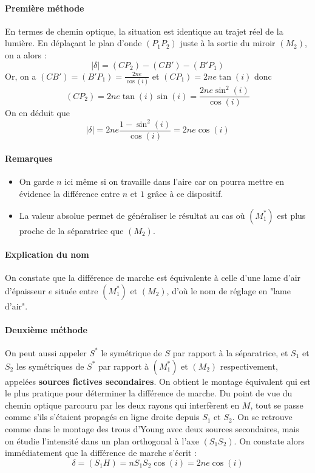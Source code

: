 \documentclass[french]{book}
\theoremstyle{plain}
\theoremstyle{definition}
\theoremstyle{remark}
\newcommand{\st}{^*}
\begin{document}
\paragraph{Première méthode}
En termes de chemin optique, la situation est identique au trajet réel de la lumière. En déplaçant le plan d'onde $(P_1P_2)$ juste à la sortie du miroir $(M_2)$, on a alors : $$\lvert\delta\rvert=(CP_2)-(CB')-(B'P_1)$$ Or, on a $(CB')=(B'P_1)=\displaystyle\frac{2ne}{\cos(i)}$ et $(CP_1)=\displaystyle 2ne\tan(i)$ donc $$(CP_2)=2ne\tan(i)\sin(i)=\frac{2ne\sin^2(i)}{\cos(i)}$$ On en déduit que $$\lvert\delta\rvert =2ne\frac{1-\sin^2(i)}{\cos(i)}=2ne\cos(i)$$
\paragraph{Remarques}
\begin{itemize}
	\item On garde $n$ ici même si on travaille dans l'aire car on pourra mettre en évidence la différence entre $n$ et $1$ grâce à ce dispositif.
	\item La valeur absolue permet de généraliser le résultat au cas où $(M_1\st)$ est plus proche de la séparatrice que $(M_2)$.	
\end{itemize}
\paragraph{Explication du nom} On constate que la différence de marche est équivalente à celle d'une lame d'air d'épaisseur $e$ située entre $(M_1\st)$ et $(M_2)$, d'où le nom de réglage en "lame d'air".
\paragraph{Deuxième méthode}
On peut aussi appeler $S\st$ le symétrique de $S$ par rapport à la séparatrice, et $S_1$ et $S_2$ les symétriques de $S\st$ par rapport à $(M_1\st)$ et $(M_2)$ respectivement, appelées \textbf{sources fictives secondaires}. On obtient le montage équivalent qui est le plus pratique pour déterminer la différence de marche. Du point de vue du chemin optique parcouru par les deux rayons qui interfèrent en $M$, tout se passe comme s'ils s'étaient propagés en ligne droite depuis $S_1$ et $S_2$. On se retrouve comme dans le montage des trous d'Young avec deux sources secondaires, mais on étudie l'intensité dans un plan orthogonal à l'axe $(S_1S_2)$. On constate alors immédiatement que la différence de marche s'écrit : $$\delta =(S_1H)=nS_1S_2\cos(i)=2ne\cos(i)$$
\end{document}
